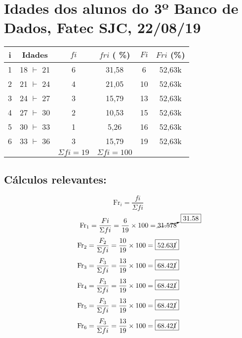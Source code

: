 \documentclass{jhwhw}
\newcommand{\fr}{\mathrm{Fr}}
\begin{document}
\section{Idades dos alunos do 3º Banco de Dados, Fatec SJC, 22/08/19}
\begin{center}
    \begin{tabular}{c | c | c | c | c | c}
        \hline
        i & Idades & $fi$ & $fri$ ( \%) & $Fi$ & $Fri$ (\%) \\
        \hline
        1 & 18 $\vdash$ 21 & 6 & 31,58 & 6 & 52,63k  \\
        2 & 21 $\vdash$ 24 & 4 & 21,05 & 10 & 52,63k \\
        3 & 24 $\vdash$ 27 & 3 & 15,79 & 13 & 52,63k \\
        4 & 27 $\vdash$ 30 & 2 & 10,53 & 15 & 52,63k \\
        5 & 30 $\vdash$ 33 & 1 & 5,26 & 16 & 52,63k \\
        6 & 33 $\vdash$ 36 & 3 & 15,79 & 19 & 52,63k \\
        \hline
          &                & $\Sigma fi = 19$  & $ \Sigma fi = 100 $      &    & 
    \end{tabular}
\end{center}
\subsection{Cálculos relevantes:}
\[
    \boxed{\fr_i = \frac{fi}{\Sigma fi}}
\]
\[
    \fr_1 = \frac{Fi}{\Sigma fi} = \frac{6}{19} \times 100 = \cancelto{\boxed{31.58}}{31.578}
\]
\[
    \fr_2 = \frac{F_2}{\Sigma fi} = \frac{10}{19} \times 100 = \boxed{52.63\cancel{1}}
\]
\[
    \fr_3 = \frac{F_3}{\Sigma fi} = \frac{13}{19} \times 100 = \boxed{68.42\cancel{1}}
\]
\[
    \fr_4 = \frac{F_3}{\Sigma fi} = \frac{13}{19} \times 100 = \boxed{68.42\cancel{1}}
\]
\[
    \fr_5 = \frac{F_3}{\Sigma fi} = \frac{13}{19} \times 100 = \boxed{68.42\cancel{1}}
\]
\[
    \fr_6 = \frac{F_3}{\Sigma fi} = \frac{13}{19} \times 100 = \boxed{68.42\cancel{1}}
\]
\end{document}
